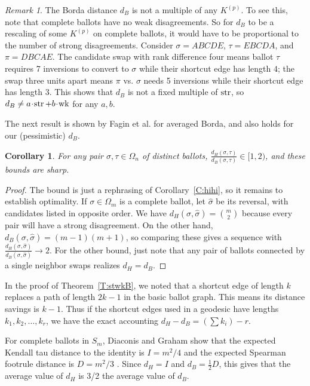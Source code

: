 \documentclass{amsart}
\newcommand{\str}{\mathop{\rm str}}
\newcommand{\wk}{\mathop{\rm wk}}
\theoremstyle{plain}
\newtheorem{corollary}[theorem]{Corollary}
\theoremstyle{definition}
\theoremstyle{remark}
\newtheorem{remark}[theorem]{Remark}
\begin{document}
\begin{remark}
The Borda distance $d_B$ is not a multiple of any $K^{(p)}$.  To see this, note that complete ballots have no weak disagreements.  
So for $d_B$ to be a rescaling of some $K^{(p)}$ on complete ballots, it would have to be proportional to the number of strong disagreements.
Consider $\sigma=ABCDE$, $\tau=EBCDA$, and $\pi=DBCAE$.  The candidate swap with rank difference four means ballot $\tau$ requires 7 inversions to convert to $\sigma$ while their shortcut edge has length $4$; the swap three units apart means $\pi$ vs. $\sigma$ needs 5 inversions while their shortcut edge has length $3$.  
This shows that $d_B$ is not a fixed multiple of $\str$, so 
$d_B\neq a\!\cdot\! \str+b\!\cdot\! \wk$ for any $a,b$.
\end{remark}

The next result is shown by Fagin et al. for averaged Borda, and also holds for our (pessimistic) $d_B$.

\begin{corollary}\label{P:my_diaconis} For any pair $\sigma,\tau\in\Omega_n$ of distinct ballots,
$\displaystyle\frac{d_H(\sigma,\tau)}{d_B(\sigma,\tau)}\in[1,2)$,
and these bounds are sharp.
\end{corollary}
\begin{proof}
The bound is just a rephrasing of Corollary~\ref{C:hihi}, so it remains to establish optimality.
If $\sigma\in\Omega_m$ is a complete ballot, let 
$\hat\sigma$ be its reversal, with candidates listed in opposite order.  We have $d_H(\sigma,\hat\sigma)=\binom{m}{2}$ because every pair will have a strong disagreement.  
On the other hand, $d_B(\sigma,\hat\sigma)= (m-1)(m+1)$, so comparing these gives a sequence with 
$\displaystyle\frac{d_H(\sigma,\hat\sigma)}{d_B(\sigma,\hat\sigma)}
\to 2$.  For the other bound, just note that any pair of ballots connected by a single neighbor swaps realizes $d_H=d_B$.
\end{proof}

In the proof of Theorem~\ref{T:stwkB}, we noted that a shortcut edge of length $k$ replaces a path of length $2k-1$ in the basic ballot graph.  This means its distance savings is $k-1$.  Thus if the shortcut edges used in a geodesic have lengths $k_1,k_2,\dots,k_r$, we have the exact accounting $d_H-d_B = (\sum k_i)-r$.  

For complete ballots in $S_m$, Diaconis and Graham show that the expected Kendall tau distance to the identity is $I=m^2/4$ and the expected Spearman footrule distance is $D=m^2/3$  \cite[Table 1]{Diaconis_Graham_1977}.  Since $d_H=I$ and $d_B=\frac 12 D$, this gives that the average value of $d_H$ is 3/2 the average value of $d_B$.
\end{document}
